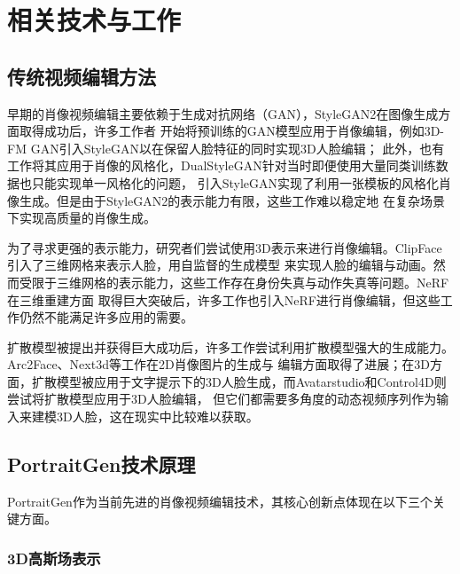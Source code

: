 \chapter{相关技术与工作}

\section{传统视频编辑方法}

早期的肖像视频编辑主要依赖于生成对抗网络（GAN），StyleGAN2在图像生成方面取得成功后，许多工作者
开始将预训练的GAN模型应用于肖像编辑，例如3D-FM GAN引入StyleGAN以在保留人脸特征的同时实现3D人脸编辑；
此外，也有工作将其应用于肖像的风格化，DualStyleGAN针对当时即便使用大量同类训练数据也只能实现单一风格化的问题，
引入StyleGAN实现了利用一张模板的风格化肖像生成。但是由于StyleGAN2的表示能力有限，这些工作难以稳定地
在复杂场景下实现高质量的肖像生成。

为了寻求更强的表示能力，研究者们尝试使用3D表示来进行肖像编辑。ClipFace引入了三维网格来表示人脸，用自监督的生成模型
来实现人脸的编辑与动画。然而受限于三维网格的表示能力，这些工作存在身份失真与动作失真等问题。NeRF在三维重建方面
取得巨大突破后，许多工作也引入NeRF进行肖像编辑，但这些工作仍然不能满足许多应用的需要。

扩散模型被提出并获得巨大成功后，许多工作尝试利用扩散模型强大的生成能力。Arc2Face、Next3d等工作在2D肖像图片的生成与
编辑方面取得了进展；在3D方面，扩散模型被应用于文字提示下的3D人脸生成，而Avatarstudio和Control4D则尝试将扩散模型应用于3D人脸编辑，
但它们都需要多角度的动态视频序列作为输入来建模3D人脸，这在现实中比较难以获取。

\section{PortraitGen技术原理}

PortraitGen作为当前先进的肖像视频编辑技术，其核心创新点体现在以下三个关键方面。

\subsection{3D高斯场表示}

